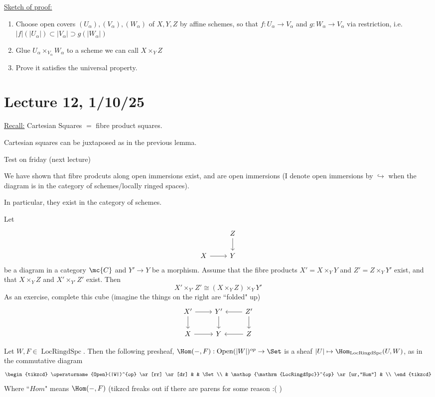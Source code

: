 \documentclass[x11names,reqno,14pt]{extarticle}
\DeclareMathOperator{\LRS}{LocRingdSpc}
\newcommand{\into}{\hookrightarrow}
\begin{document}
\underline{Sketch of proof:}\,
\begin{enumerate}

\item Choose open covers $(U_\alpha),(V_\alpha),(W_\alpha)$ of $X, Y, Z$ by affine schemes, so that $f:U_\alpha\to V_\alpha$ and $g:W_\alpha\to V_\alpha$ via restriction, i.e. $|f|(|U_\alpha|) \subset |V_\alpha| \supset g(|W_\alpha|)$

\item Glue $U_\alpha\times_{V_\alpha}W_\alpha$ to a scheme we can call $X\times_YZ$ 

\item Prove it satisfies the universal property. 

\end{enumerate}

\section*{Lecture 12, 1/10/25}

\underline{Recall:} Cartesian Squares $=$ fibre product squares. 


Cartesian squares can be juxtaposed as in the previous lemma.

Test on friday (next lecture) 

We have shown that fibre prodcuts along open immersions exist, and are open immersions (I denote open immersions by $\into$ when the diagram is in the category of schemes/locally ringed spaces). 

In particular, they exist in the category of schemes. 

\lem

Let 
\[
\begin{tikzcd}
& Z \ar[d] \\
X \ar[r] & Y 
\end{tikzcd}
\]
be a diagram in a category $\mc{C}$ and $Y'\to Y$ be a morphism. Assume that the fibre products $X'= X\times_Y Y $ and $Z' = Z\times_YY'$ exist, and that $X\times_YZ$ and $X'\times_{Y'}Z'$ exist. Then
\[
X'\times_{Y'}Z' \cong (X\times_YZ)\times_YY'
\]
As an exercise, complete this cube (imagine the things on the right are ``folded" up)
\[
\begin{tikzcd}
X' \ar[r] \ar[d] & Y' \ar[d] & Z'\ar[d]\ar[l] \\
X \ar[r] & Y  & Z \ar[l]
\end{tikzcd}
\]

\lem

Let $W, F \in \LRS$. Then the following presheaf, $\Hom(-,F):\operatorname{Open}(|W|)^{op}\to\Set$ is a sheaf $|U|\mapsto\Hom_{\LRS}(U,W)$, as in the commutative diagram
\[
\begin{tikzcd}
\operatorname{Open}(|W|)^{op} \ar[rr] \ar[dr] & & \Set \\
& \LRS^{op} \ar[ur,"Hom"] & \\
\end{tikzcd}
\]
Where ``$Hom$" means $\Hom(-,F)$ (tikzcd freaks out if there are parens for some reason :( ) 
\end{document}
